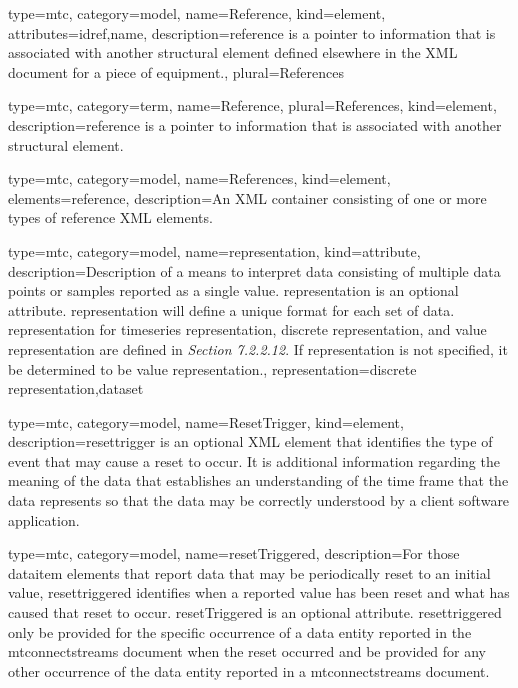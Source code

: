 {
  type={mtc},
  category=model,
  name={Reference},
  kind={element},
  attributes={\gls{idref},\gls{name}},
  description={\gls{reference} is a pointer to information that is associated with another \gls{structural element} defined elsewhere in the XML document for a piece of equipment.},
  plural={References}
}

{
  type={mtc},
  category=term,
  name={Reference},
  plural={References},
  kind={element},
  description={\gls{reference} is a pointer to information that is associated with another \gls{structural element}.}
}

{
  type=mtc,
  category=model,
  name={References},
  kind={element},
  elements={\gls{reference}},
  description={An XML container consisting of one or more types of \gls{reference} XML elements.}
}


{
  type=mtc,
  category=model,
  name={representation},
  kind={attribute},
  description={Description of a means to interpret data consisting of multiple data points or samples reported as a single value.  \newline \gls{representation} is an optional attribute.  \newline \gls{representation} will define a unique format for each set of data.  \newline \gls{representation} for \gls{timeseries representation}, \gls{discrete representation}, and \gls{value representation} are defined in  \textit{Section 7.2.2.12}.  \newline If \gls{representation} is not specified, it \MUST be determined to be \gls{value representation}.},
  representation={\gls{discrete representation},\gls{dataset}}
}

{
  type=mtc,
  category=model,
  name={ResetTrigger},
  kind={element},
  description={\gls{resettrigger} is an optional XML element that identifies the type of event that may cause a reset to occur. It is additional information regarding the meaning of the data that establishes an understanding of the time frame that the data represents so that the data may be correctly understood by a client software application.}
}


{
  type=mtc,
  category=model,
  name={resetTriggered},
  description={For those \gls{dataitem} elements that report data that may be periodically reset to an initial value, \gls{resettriggered} identifies when a reported value has been reset and what has caused that reset to occur.  \newline resetTriggered is an optional attribute.  \newline \gls{resettriggered} \MUST only be provided for the specific occurrence of a \gls{data entity} reported in the \gls{mtconnectstreams} document when the reset occurred and \MUSTNOT be provided for any other occurrence of the \gls{data entity} reported in a \gls{mtconnectstreams} document.}
}


